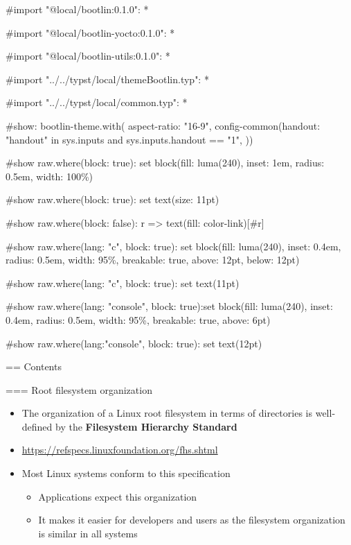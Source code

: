 #import "@local/bootlin:0.1.0": *

#import "@local/bootlin-yocto:0.1.0": *

#import "@local/bootlin-utils:0.1.0": *

#import "../../typst/local/themeBootlin.typ": *

#import "../../typst/local/common.typ": *

#show: bootlin-theme.with( aspect-ratio: "16-9", config-common(handout: "handout" in sys.inputs and sys.inputs.handout == "1", ))

#show raw.where(block: true): set block(fill: luma(240), inset: 1em, radius: 0.5em, width: 100\%)

#show raw.where(block: true): set text(size: 11pt)

#show raw.where(block: false): r => text(fill: color-link)[#r]

#show raw.where(lang: "c", block: true): set block(fill: luma(240), inset: 0.4em, radius: 0.5em, width: 95\%, breakable: true, above: 12pt, below: 12pt)

#show raw.where(lang: "c", block: true): set text(11pt)

#show raw.where(lang: "console", block: true):set block(fill: luma(240), inset: 0.4em, radius: 0.5em, width: 95\%, breakable: true, above: 6pt)

#show raw.where(lang:"console", block: true): set text(12pt)

 == Contents

=== Root filesystem organization
  \begin{itemize}
  \item The organization of a Linux root filesystem in terms of
    directories is well-defined by the {\bf Filesystem Hierarchy
      Standard}
  \item \url{https://refspecs.linuxfoundation.org/fhs.shtml}
  \item Most Linux systems conform to this specification
    \begin{itemize}
    \item Applications expect this organization
    \item It makes it easier for developers and users as the
      filesystem organization is similar in all systems
    \end{itemize}
  \end{itemize}


